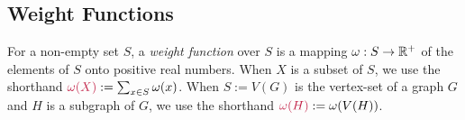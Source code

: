 \documentclass{patmorin}
\makeatletter
\newcommand{\pat}[1]{\noindent\textcolor{Magenta}{PaMo: #1}}
\newcommand{\gwen}[1]{\noindent\textcolor{Purple}{GJ: #1}}
\newcommand{\defin}[1]{\emph{\textcolor{brightmaroon}{#1}}}
\def\mathcolor#1#{\@mathcolor{#1}}
\def\@mathcolor#1#2#3{%
  \protect\leavevmode
  \begingroup
    \color#1{#2}#3%
  \endgroup
}
\newcommand{\mathdefin}[1]{\mathcolor{brightmaroon}{#1}}
\newcommand{\calT}{\mathcal{T}}
\makeatother
\begin{document}









  \subsection{Weight Functions}

  For a non-empty set $S$, a \defin{weight function} over $S$ is a mapping $\omega:S\to\mathbb{R}^+$ of the elements of $S$ onto positive real numbers.  When $X$ is a subset of $S$, we use the shorthand $\mathdefin{\omega(X)}:=\sum_{x\in S}\omega(x)$.  When $S:=V(G)$ is the vertex-set of a graph $G$ and $H$ is a subgraph of $G$, we use the shorthand $\mathdefin{\omega(H)}:=\omega(V(H))$.
\end{document}
